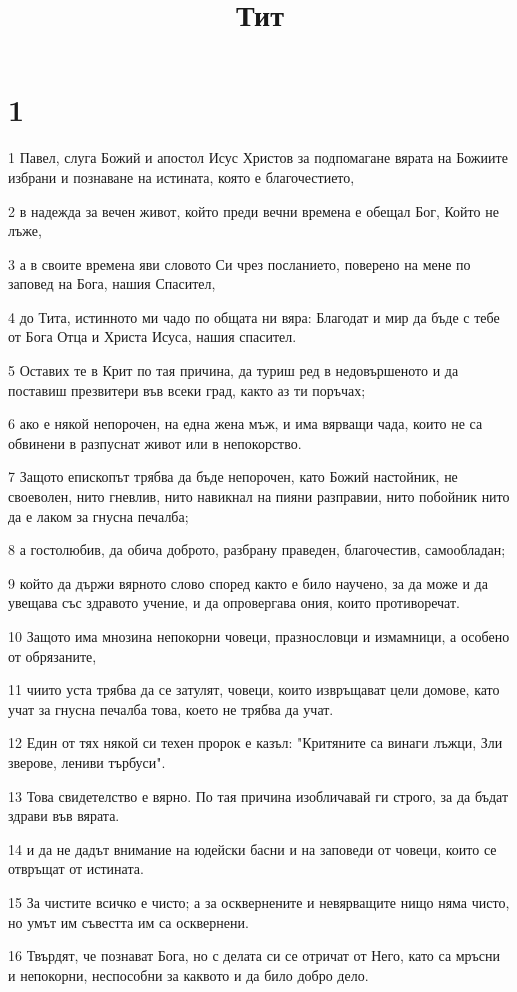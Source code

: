 

\title{Тит}


\chapter{1}

\par 1 Павел, слуга Божий и апостол Исус Христов за подпомагане вярата на Божиите избрани и познаване на истината, която е благочестието,
\par 2 в надежда за вечен живот, който преди вечни времена е обещал Бог, Който не лъже,
\par 3 а в своите времена яви словото Си чрез посланието, поверено на мене по заповед на Бога, нашия Спасител,
\par 4 до Тита, истинното ми чадо по общата ни вяра: Благодат и мир да бъде с тебе от Бога Отца и Христа Исуса, нашия спасител.
\par 5 Оставих те в Крит по тая причина, да туриш ред в недовършеното и да поставиш презвитери във всеки град, както аз ти поръчах;
\par 6 ако е някой непорочен, на една жена мъж, и има вярващи чада, които не са обвинени в разпуснат живот или в непокорство.
\par 7 Защото епископът трябва да бъде непорочен, като Божий настойник, не своеволен, нито гневлив, нито навикнал на пияни разправии, нито побойник нито да е лаком за гнусна печалба;
\par 8 а гостолюбив, да обича доброто, разбрану праведен, благочестив, самообладан;
\par 9 който да държи вярното слово според както е било научено, за да може и да увещава със здравото учение, и да опровергава ония, които противоречат.
\par 10 Защото има мнозина непокорни човеци, празнословци и измамници, а особено от обрязаните,
\par 11 чиито уста трябва да се затулят, човеци, които извръщават цели домове, като учат за гнусна печалба това, което не трябва да учат.
\par 12 Един от тях някой си техен пророк е казъл: "Критяните са винаги лъжци, Зли зверове, лениви търбуси".
\par 13 Това свидетелство е вярно. По тая причина изобличавай ги строго, за да бъдат здрави във вярата.
\par 14 и да не дадът внимание на юдейски басни и на заповеди от човеци, които се отвръщат от истината.
\par 15 За чистите всичко е чисто; а за осквернените и невярващите нищо няма чисто, но умът им съвестта им са осквернени.
\par 16 Твърдят, че познават Бога, но с делата си се отричат от Него, като са мръсни и непокорни, неспособни за каквото и да било добро дело.

